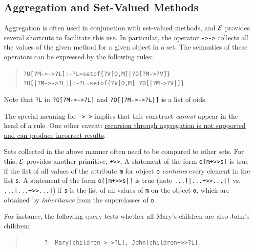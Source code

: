 \documentclass[11pt]{article}
\newcommand{\ERGO}{\mbox{\ensuremath{\cal{E}}\smaller{{\sc{RGO}}}}\xspace}
\newcommand{\FLSYSTEM}{\ERGO}
\begin{document}
\subsection {Aggregation and Set-Valued Methods}

\index{{\tt ->->}}
Aggregation is often used in conjunction with set-valued methods, and
\FLSYSTEM provides several shortcuts to facilitate this use.
In particular, the operator {\tt ->->} 
collects all the values of the given
method for a given object in a set. The semantics of these operators can be
expressed by the following rules:

\begin{quote}
\begin{alltt}
?O[?M->->?L] :- ?L=setof\{?V[O,M]|?O[?M->?V]\} \vspace{2mm}
?O[|?M->->?L|] :- ?L=setof\{?V[O,M]|?O[|?M->?V|]\}
\end{alltt}
\end{quote}

\noindent
Note that \texttt{?L}  in {\tt ?O[?M->->?L]}  and {\tt ?O[|?M->->?L|]} is a list of oids.

The special meaning for {\tt ->->} implies that this
construct \emph{cannot} appear in the head of a rule.
One other caveat: \underline{recursion through aggregation is not supported and can
produce incorrect results}.



\index{\tt +>{}>}
Sets collected in the above manner often  need to be compared to other
sets. For this, \FLSYSTEM provides another primitive, {\tt +>{}>}.
A statement of the form {\tt o[m+>{}>s]} is true if the list of all values of the
attribute {\tt m} for object {\tt o} \emph{contains} every
element in the list {\tt s}.  
A statement of the form \texttt{o[|m+>{}>s|]}  is true (note 
\texttt{...[|...+>{}>...|]}   vs. \texttt{...[...+>{}>...]})
if \texttt{s} is the
list of all values of \texttt{m} on the object \texttt{o}, which are
obtained by \emph{inheritance} from the superclasses of \texttt{o}.   

For instance, the following query tests whether all Mary's children are
also John's children:
\begin{quote}
\begin{verbatim}
      ?- Mary[children->->?L], John[children+>>?L].
\end{verbatim}
\end{quote}
\end{document}
